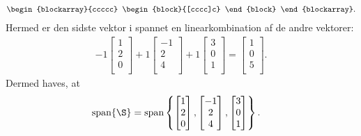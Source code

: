 \begin{eks}
\begin{align*}
\begin{blockarray}{ccccc}
\begin{block}{[cccc]c}
\end{block}
\end{blockarray}.
%
\end{align*}
%
Hermed er den sidste vektor i spannet en linearkombination af de andre vektorer:
%
  \begin{align*}
         -1 \begin{bmatrix}
           1 \\
           2 \\
           0 \\
         \end{bmatrix}
         +1
         \begin{bmatrix}
           -1 \\
           2 \\
           4 \\
         \end{bmatrix}
          +1
         \begin{bmatrix}
           3 \\
           0 \\
           1 \\
         \end{bmatrix}
         =
         \begin{bmatrix}
           1 \\
           0 \\
           5 \\
         \end{bmatrix}.
  \end{align*} 
%
Dermed haves, at
%
\begin{align*}
\text{span}\{\S \} &=\text{span}
\left\{
\begin{bmatrix}
           1 \\
           2 \\
           0 \\
\end{bmatrix}
,
\begin{bmatrix}
           -1 \\
           2 \\
           4 \\
\end{bmatrix}
,
\begin{bmatrix}
           3 \\
           0 \\
           1 \\
\end{bmatrix}
\right\}.
\end{align*}
\end{eks}
